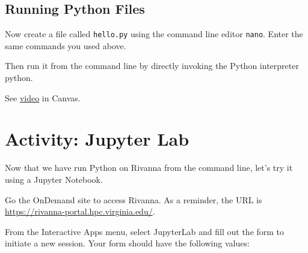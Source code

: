 \documentclass[
  letterpaper,
  DIV=11,
  numbers=noendperiod]{scrreprt}
\begin{document}
\hypertarget{running-python-files}{%
\section{Running Python Files}\label{running-python-files}}

Now create a file called \texttt{hello.py} using the command line editor
\texttt{nano}. Enter the same commands you used above.

Then run it from the command line by directly invoking the Python
interpreter python.

\begin{tcolorbox}[enhanced jigsaw, toprule=.15mm, opacityback=0, opacitybacktitle=0.6, colback=white, breakable, title=\textcolor{quarto-callout-note-color}{\faInfo}\hspace{0.5em}{Note}, toptitle=1mm, left=2mm, titlerule=0mm, bottomtitle=1mm, rightrule=.15mm, coltitle=black, colbacktitle=quarto-callout-note-color!10!white, colframe=quarto-callout-note-color-frame, arc=.35mm, bottomrule=.15mm, leftrule=.75mm]

See
\href{https://343772-1.kaf.kaltura.com/media/M02\%20Activity\%3A\%20Hello\%2C\%20World!/1_mk92k4i5}{video}
in Canvas.

\end{tcolorbox}

\hypertarget{activity-jupyter-lab}{%
\chapter{Activity: Jupyter Lab}\label{activity-jupyter-lab}}

Now that we have run Python on Rivanna from the command line, let's try
it using a Jupyter Notebook.

Go the OnDemand site to access Rivanna. As a reminder, the URL is
\url{https://rivanna-portal.hpc.virginia.edu/}.

From the Interactive Apps menu, select JupyterLab and fill out the form
to initiate a new session. Your form should have the following values:
\end{document}
